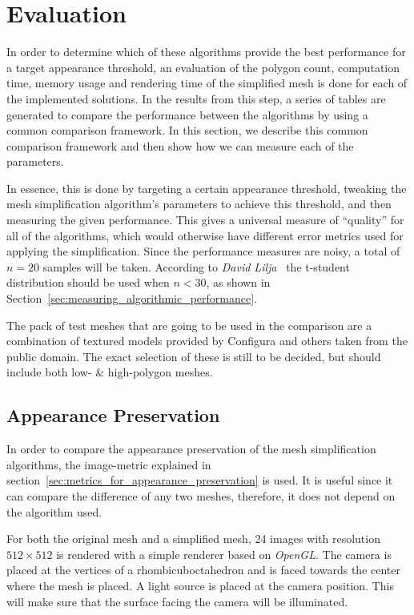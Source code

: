 \section{Evaluation} \label{sec:evaluation}

In order to determine which of these algorithms provide the best performance for a target appearance threshold, an evaluation of the polygon count, computation time, memory usage and rendering time of the simplified mesh is done for each of the implemented solutions. In the results from this step, a series of tables are generated to compare the performance between the algorithms by using a common comparison framework. In this section, we describe this common comparison framework and then show how we can measure each of the parameters.

In essence, this is done by targeting a certain appearance threshold, tweaking the mesh simplification algorithm's parameters to achieve this threshold, and then measuring the given performance. This gives a universal measure of ``quality'' for all of the algorithms, which would otherwise have different error metrics used for applying the simplification. Since the performance measures are noisy, a total of \(n=20\) samples will be taken. According to \emph{David Lilja}~\cite[p.~50]{lilja2005measuring} the t-student distribution should be used when \(n < 30\), as shown in Section~\ref{sec:measuring_algorithmic_performance}.

The pack of test meshes that are going to be used in the comparison are a combination of textured models provided by Configura and others taken from the public domain. The exact selection of these is still to be decided, but should include both low- \& high-polygon meshes.

\subsection{Appearance Preservation} \label{sec:appearance_preservation}
In order to compare the appearance preservation of the mesh simplification algorithms, the image-metric explained in section~\ref{sec:metrics_for_appearance_preservation} is used. It is useful since it can compare the difference of any two meshes, therefore, it does not depend on the algorithm used.

For both the original mesh and a simplified mesh, 24 images with resolution $512 \times 512$ is rendered with a simple renderer based on \emph{OpenGL}. The camera is placed at the vertices of a rhombicuboctahedron and is faced towards the center where the mesh is placed. A light source is placed at the camera position. This will make sure that the surface facing the camera will be illuminated.

